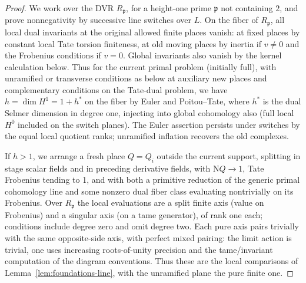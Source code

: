 \begin{proof}
We work over the DVR \(R_{\mathfrak p}\), for a height-one prime
\(\mathfrak p\) not containing \(2\), and prove nonnegativity by
successive line switches over \(L\). On the fiber of \(R_{\mathfrak p}\), all local dual invariants at the original
allowed finite places vanish: at fixed places by constant local Tate torsion finiteness, at
old moving places by inertia if \(v\ne0\) and the Frobenius conditions if \(v=0\). Global
invariants also vanish by the kernel calculation below. Thus for the current primal problem
(initially full), with unramified or transverse conditions as below at auxiliary new places
and complementary conditions on the Tate-dual problem, we have
\(h=\dim H^1=1+h^*\)
on the fiber by Euler and Poitou--Tate, where \(h^*\) is the dual Selmer dimension in degree
one, injecting into global cohomology also (full local \(H^0\) included on the switch planes).
The Euler assertion persists under switches by the equal local quotient ranks; unramified
inflation recovers the old complexes.

If \(h>1\), we arrange a fresh place \(Q=Q_i\) outside the current support, splitting in stage
scalar fields and in preceding derivative fields, with \(\mathrm N Q\to1\), Tate Frobenius
tending to 1, and with both a primitive reduction of the generic primal cohomology line and
some nonzero dual fiber class evaluating nontrivially on its Frobenius. Over \(R_{\mathfrak
p}\) the local evaluations are a split finite axis (value on Frobenius) and a singular axis
(on a tame generator), of rank one each; conditions include degree zero and omit degree two.
Each pure axis pairs trivially with the same opposite-side axis, with perfect mixed pairing:
the limit action is trivial, one uses increasing roots-of-unity precision and the
tame/invariant computation of the diagram conventions. Thus these are the local comparisons of
Lemma~\ref{lem:foundations-line}, with the unramified plane the pure finite one.


\end{proof}
